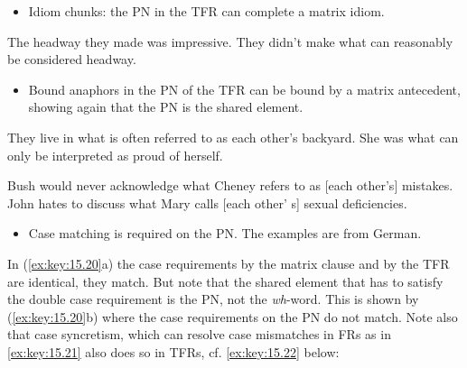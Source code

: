 \documentclass[output=paper]{langsci/langscibook}
\begin{document}
\begin{refcontext}
\begin{itemize}
    \item Idiom chunks: the \gls{PN} in the \gls{TFR} can complete a matrix
        idiom.

\end{itemize}

\ea\label{ex:key:15.17}
    \ea The headway they made was impressive.
    \ex They didn't make what can reasonably be considered headway.
    \z
\z

\begin{itemize}
    \item Bound anaphors in the \gls{PN} of the \gls{TFR} can be bound by a matrix
antecedent, showing again that the \gls{PN} is the shared element.
\end{itemize}

\ea\label{ex:key:15.18}
    \ea They live in what is often referred to as each other's backyard.
    \ex She was what can only be interpreted as proud of herself.
    \z
\z

\ea\label{ex:key:15.19}
    \ea Bush would never acknowledge what Cheney refers to as [each other’s] mistakes.
    \ex John hates to discuss what Mary calls [each other’ s] sexual deficiencies.
    \z
\z

\begin{itemize}
    \item Case matching is required on the \gls{PN}. The examples are from German.
\end{itemize}
\ea\label{ex:key:15.20}
    \z
\z
In (\ref{ex:key:15.20}a) the case requirements by the matrix clause and by the \gls{TFR} are
identical, they match. But note that the shared element that has to satisfy the
double case requirement is the \gls{PN}, not the \emph{wh}{}-word. This is
shown by (\ref{ex:key:15.20}b) where the case requirements on the \gls{PN} do not match. Note
also that case syncretism, which can resolve case mismatches in \glspl{FR} as
in \eqref{ex:key:15.21} also does so in \glspl{TFR}, cf. \eqref{ex:key:15.22} below:


\end{refcontext}
\end{document}
